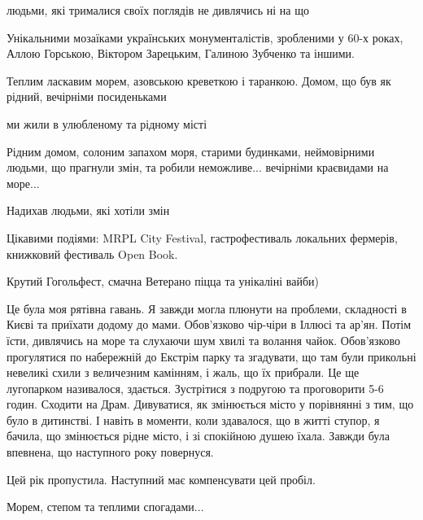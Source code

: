 
людьми, які трималися своїх поглядів не дивлячись ні на що


Унікальними мозаїками українських монументалістів, зробленими у 60-х роках,
Аллою Горською, Віктором Зарецьким, Галиною Зубченко та іншими.


Теплим ласкавим морем, азовською креветкою і таранкою. Домом, що був як рідний,
вечірніми посиденьками


ми жили в улюбленому та рідному місті


Рідним домом, солоним запахом моря, старими будинками, неймовірними людьми, що
прагнули змін, та робили неможливе... вечірніми краєвидами на море...


Надихав людьми, які хотіли змін


Цікавими подіями: MRPL City Festival, гастрофестиваль локальних фермерів,
книжковий фестиваль Open Book.


Крутий Гогольфест, смачна Ветерано піцца та унікаліні вайби)


Це була моя рятівна гавань. Я завжди могла плюнути на проблеми, складності в
Києві та приїхати додому до мами. Обов'язково чір-чіри в Іллюсі та ар'ян. Потім
їсти, дивлячись на море та слухаючи шум хвилі та волання чайок. Обов'язково
прогулятися по набережній до Екстрім парку та згадувати, що там були прикольні
невеликі схили з величезним камінням, і жаль, що їх прибрали. Це ще лугопарком
називалося, здається. Зустрітися з подругою та проговорити 5-6 годин. Сходити
на Драм. Дивуватися, як змінюється місто у порівнянні з тим, що було в
дитинстві. І навіть в моменти, коли здавалося, що в житті ступор, я бачила, що
змінюється рідне місто, і зі спокійною душею їхала. Завжди була впевнена, що
наступного року повернуся.

Цей рік пропустила. Наступний має компенсувати цей пробіл.


Морем, степом та теплими спогадами...

